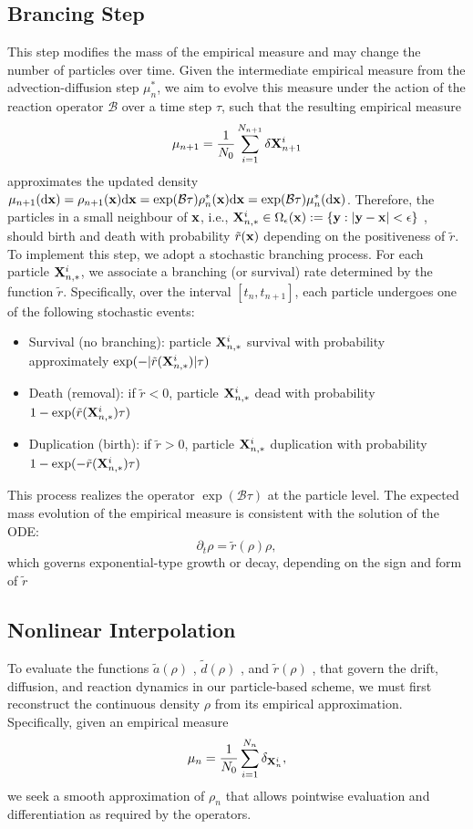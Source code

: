 \documentclass[12pt]{article}
\begin{document}
\subsection{Brancing Step}
This step modifies the mass of the empirical measure and may change the number of particles over time. Given the intermediate empirical measure from the advection-diffusion step $\mu_n^*$, we aim to evolve this measure under the action of the reaction operator $\mathcal  B$ over a time step $\tau$, such that the resulting empirical measure
\begin{equation}
    \mu_{n+1} = \frac{1}{N_0} \sum_{i=1}^{N_{n+1}} \delta \mathbf{X}^i_{n+1}
\end{equation}
approximates the updated density $\mu_{n+1}(\mathrm{d} \mathbf{x} ) = \rho_{n+1}(\mathbf{x}) \mathrm{d} \mathbf{x} = \exp(\mathcal B\tau) \rho_{n}^*(\mathbf{x}) \mathrm{d} \mathbf{x} = \exp(\mathcal  B\tau) \mu_{n}^*(\mathrm{d} \mathbf{x})$. Therefore, the particles in a small neighbour of $\mathbf{x}$, i.e., $\mathbf{X}^i_{n,*}\in \Omega_\epsilon(\mathbf{x}) := \{\mathbf{y}:|\mathbf{y}-\mathbf{x}|<\epsilon\}$ , should birth and death with probability $\tilde r(\mathbf{x})$ depending on the positiveness of $\tilde r$.
To implement this step, we adopt a stochastic branching process. For each particle $\mathbf{X}^i_{n,*}$, we associate a branching (or survival) rate determined by the function $\tilde r $. Specifically, over the interval $[t_n,t_{n+1}]$, each particle undergoes one of the following stochastic events:
\begin{itemize}
    \item Survival (no branching): particle $\mathbf{X}^i_{n,*}$ survival with probability approximately $\exp(-|\tilde r(\mathbf{X}^i_{n,*})|\tau)$
    \item Death (removal): if $\tilde r<0 $, particle $\mathbf{X}^i_{n,*}$ dead  with probability $1-\exp(\tilde r(\mathbf{X}^i_{n,*})\tau)$
    \item Duplication (birth): if $\tilde r>0 $, particle $\mathbf{X}^i_{n,*}$ duplication  with probability $1-\exp(-\tilde r(\mathbf{X}^i_{n,*})\tau)$
\end{itemize}

This process realizes the operator $\exp(\mathcal B\tau)$ at the particle level. The expected mass evolution of the empirical measure is consistent with the solution of the ODE:
\begin{equation}
\partial_t \rho = \tilde{r}(\rho) \rho,
\end{equation}
which governs exponential-type growth or decay, depending on the sign and form of $\tilde r$



\subsection{Nonlinear Interpolation}
To evaluate the functions $\tilde a(\rho)$ ,  $\tilde d(\rho)$ , and $\tilde r(\rho)$ , that govern the drift, diffusion, and reaction dynamics in our particle-based scheme, we must first reconstruct the continuous density 
$\rho$ from its empirical approximation. Specifically, given an empirical measure
\[
\mu_n= \frac{1}{N_0}\sum_{i=1}^{N_n}\delta_{\mathbf{X}_n^i},
\] 
we seek a smooth approximation of $\rho_n$ that allows pointwise evaluation and differentiation as required by the operators.
\end{document}
